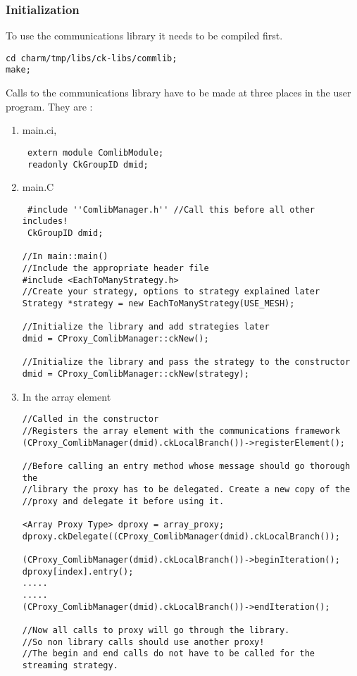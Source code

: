 \subsubsection{Initialization}

To use the communications library it needs to be compiled first.

\begin{verbatim}
cd charm/tmp/libs/ck-libs/commlib;
make;
\end{verbatim}

Calls to the communications library have to be made at three places in
the user program. They are :

\begin{enumerate}

\item main.ci, \\
\begin{verbatim}
 extern module ComlibModule; 
 readonly CkGroupID dmid; 
\end{verbatim}

\item main.C \\
\begin{verbatim}
 #include ''ComlibManager.h'' //Call this before all other includes!
 CkGroupID dmid; 

//In main::main() 
//Include the appropriate header file
#include <EachToManyStrategy.h>
//Create your strategy, options to strategy explained later
Strategy *strategy = new EachToManyStrategy(USE_MESH);

//Initialize the library and add strategies later
dmid = CProxy_ComlibManager::ckNew(); 

//Initialize the library and pass the strategy to the constructor
dmid = CProxy_ComlibManager::ckNew(strategy); 

\end{verbatim}

\item In the array element \\
\begin{verbatim}
//Called in the constructor
//Registers the array element with the communications framework
(CProxy_ComlibManager(dmid).ckLocalBranch())->registerElement();

//Before calling an entry method whose message should go thorough the
//library the proxy has to be delegated. Create a new copy of the
//proxy and delegate it before using it.

<Array Proxy Type> dproxy = array_proxy;
dproxy.ckDelegate((CProxy_ComlibManager(dmid).ckLocalBranch());

(CProxy_ComlibManager(dmid).ckLocalBranch())->beginIteration();
dproxy[index].entry();
.....
.....
(CProxy_ComlibManager(dmid).ckLocalBranch())->endIteration();

//Now all calls to proxy will go through the library.
//So non library calls should use another proxy!
//The begin and end calls do not have to be called for the streaming strategy.
\end{verbatim}
\end{enumerate}

